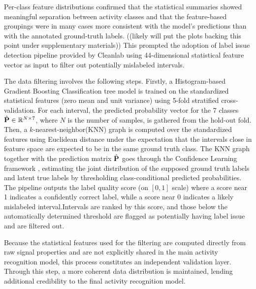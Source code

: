 Per-class feature distributions confirmed that the statistical summaries showed meaningful separation between activity classes and that the feature-based groupings were in many cases more consistent with the model's predictions than with the annotated ground-truth labels. ((likely will put the plots backing this point under supplementary materials)) This prompted the adoption of label issue detection pipeline provided by Cleanlab \cite{} using 44-dimensional statistical feature vector as input to filter out potentially mislabeled intervals.



The data filtering involves the following steps. Firstly, a Histogram-based Gradient Boosting Classification tree model is trained on the standardized statistical features (zero mean and unit variance) using 5-fold stratified cross-validation. For each interval, the predicted probability vector for the 7 classes $\hat{\bf{P}} \in \mathbb{R}^{N \times 7}$, where $N$ is the number of samples, is gathered from the hold-out fold. Then, a $k$-nearest-neighbor(KNN) graph is computed over the standardized features using Euclidean distance under the expectation that the intervals close in feature space are expected to be in the same ground truth class. The KNN graph together with the prediction matrix $\hat{\bf{P}}$ goes through the Confidence Learning framework \cite{northcutt2017learning, northcutt2021confident}, estimating the joint distribution of the supposed ground truth labels and latent true labels by thresholding class-conditional predicted probabilities. The pipeline outputs the label quality score (on $[0, 1]$ scale) where a score near 1 indicates a confidently correct label, while a score near 0 indicates a likely mislabeled interval.Intervals are ranked by this score, and those below the automatically determined threshold are flagged as potentially having label issue and are filtered out.


Because the statistical features used for the filtering are computed directly from raw signal properties and are not explicitly shared in the main activity recognition model, this process constitutes an independent validation layer. Through this step, a more coherent data distribution is maintained, lending additional credibility to the final activity recognition model.

